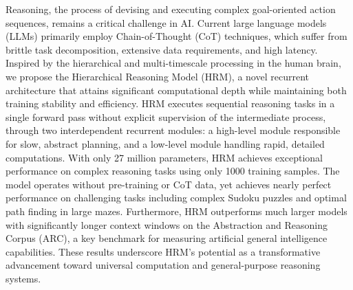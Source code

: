 Reasoning, the process of devising and executing complex goal-oriented action sequences, remains a critical challenge in AI.
Current large language models (LLMs) primarily employ Chain-of-Thought (CoT) techniques, which suffer from brittle task decomposition, extensive data requirements, and high latency. Inspired by the hierarchical and multi-timescale processing in the human brain, we propose the Hierarchical Reasoning Model (HRM), a novel recurrent architecture that attains significant computational depth while maintaining both training stability and efficiency.
HRM executes sequential reasoning tasks in a single forward pass without explicit supervision of the intermediate process, through two interdependent recurrent modules: a high-level module responsible for slow, abstract planning, and a low-level module handling rapid, detailed computations. With only 27 million parameters, HRM achieves exceptional performance on complex reasoning tasks using only 1000 training samples. The model operates without pre-training or CoT data, yet achieves nearly perfect performance on challenging tasks including complex Sudoku puzzles and optimal path finding in large mazes.
Furthermore, HRM outperforms much larger models with significantly longer context windows on the Abstraction and Reasoning Corpus (ARC), a key benchmark for measuring artificial general intelligence capabilities.
These results underscore HRM’s potential as a transformative advancement toward universal computation and general-purpose reasoning systems.